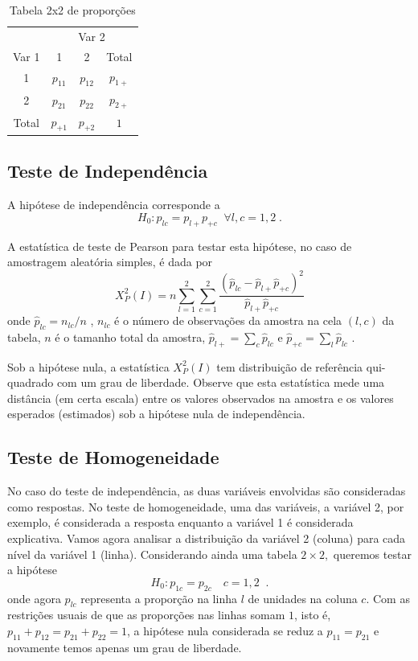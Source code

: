 \documentclass[]{book}
\numberwithin{example}{chapter}
\numberwithin{remark}{chapter}
\numberwithin{definition}{chapter}
\begin{document}
\begin{center}
\begin{table}[tbp] \centering
\caption{Tabela 2x2 de proporções }\bigskip \label{tab81}
\begin{tabular}{|c|c|c|c|}
\hline
& \multicolumn{3}{|c|}{Var 2} \\ \cline{2-4}
Var 1 & 1 & 2 & Total \\ \hline
1 & $p_{11}$ & $p_{12}$ & $p_{1+}$ \\ 
2 & $p_{21}$ & $p_{22}$ & $p_{2+}$ \\ \hline
Total & $p_{+1}$ & $p_{+2}$ & $1$ \\ \hline
\end{tabular}
\end{table}
\end{center}

\subsection{Teste de Independência}\label{teste-de-independencia}

A hipótese de independência corresponde a \[
H_{0}:p_{lc}=p_{l+}p_{+c}\;\;\forall l,c=1,2\;. 
\]

A estatística de teste de Pearson para testar esta hipótese, no caso de
amostragem aleatória simples, é dada por \[
X_{P}^{2}\left( I\right) =n\sum\limits_{l=1}^{2}\sum\limits_{c=1}^{2}\frac{
\left( \hat{p}_{lc}-\hat{p}_{l+}\hat{p}_{+c}\right) ^{2}}{\hat{p}_{l+}\hat{p}
_{+c}} 
\] onde \(\hat{p}_{lc}=n_{lc}/n\) , \(n_{lc}\) é o número de observações
da amostra na cela \(\left( l,c\right)\) da tabela, \(n\) é o tamanho
total da amostra, \(\hat{p}_{l+}=\sum\nolimits_{c}\widehat{p}_{lc}\) e
\(\hat{p}_{+c}=\sum_{l}\hat{p}_{lc}\) .

Sob a hipótese nula, a estatística \(X_{P}^{2}\left( I\right)\) tem
distribuição de referência qui-quadrado com um grau de liberdade.
Observe que esta estatística mede uma distância (em certa escala) entre
os valores observados na amostra e os valores esperados (estimados) sob
a hipótese nula de independência.

\subsection{Teste de Homogeneidade}\label{teste-de-homogeneidade}

No caso do teste de independência, as duas variáveis envolvidas são
consideradas como respostas. No teste de homogeneidade, uma das
variáveis, a variável 2, por exemplo, é considerada a resposta enquanto
a variável 1 é considerada explicativa. Vamos agora analisar a
distribuição da variável 2 (coluna) para cada nível da variável 1
(linha). Considerando ainda uma tabela \(2\times 2,\) queremos testar a
hipótese \[
H_{0}:p_{1c}=p_{2c}\quad c=1,2\;\;. 
\] onde agora \(p_{lc}\) representa a proporção na linha \(l\) de
unidades na coluna \(c\). Com as restrições usuais de que as proporções
nas linhas somam \(1\), isto é, \(p_{11}+p_{12}=p_{21}+p_{22}=1\), a
hipótese nula considerada se reduz a \(p_{11}=p_{21}\) e novamente temos
apenas um grau de liberdade.
\end{document}
